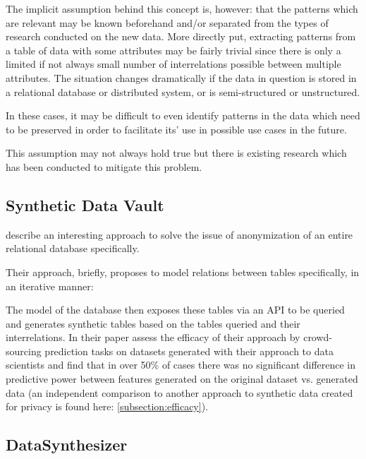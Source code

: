 The implicit assumption behind this concept is, however: that the patterns which are relevant may be known beforehand and/or separated from the types of research conducted on the new data. More directly put, extracting patterns from a table of data with some attributes may be fairly trivial since there is only a limited if not always small number of interrelations possible between multiple attributes. 
The situation changes dramatically if the data in question is stored in a relational database or distributed system, or is semi-structured or unstructured.

In these cases, it may be difficult to even identify patterns in the data which need to be preserved in order to facilitate its' use in possible use cases in the future.

This assumption may not always hold true but there is existing research which has been conducted to mitigate this problem.

\pagebreak

\subsection{Synthetic Data Vault}

\cite{patki2016synthetic} describe an interesting approach to solve the issue of anonymization of an entire relational database specifically. 

Their approach, briefly, proposes to model relations between tables specifically, in an iterative manner:


The model of the database then exposes these tables via an \ac{API} to be queried and generates synthetic tables based on the tables queried and their interrelations.
In their paper \cite{patki2016synthetic} assess the efficacy of their approach by crowd-sourcing prediction tasks on datasets generated with their approach to data scientists and find that in over 50\% of cases 
there was no significant difference in predictive power between features generated on the original dataset vs. generated data (an independent comparison to another approach to synthetic data created for privacy is found here: \ref{subsection:efficacy}).

\pagebreak

\subsection{DataSynthesizer}
\label{subsection:datasynthesizer}

